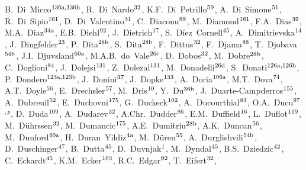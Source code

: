 \begin{flushleft}
B.~Di~Micco$^\textrm{\scriptsize 136a,136b}$,
R.~Di~Nardo$^\textrm{\scriptsize 32}$,
K.F.~Di~Petrillo$^\textrm{\scriptsize 59}$,
A.~Di~Simone$^\textrm{\scriptsize 51}$,
R.~Di~Sipio$^\textrm{\scriptsize 161}$,
D.~Di~Valentino$^\textrm{\scriptsize 31}$,
C.~Diaconu$^\textrm{\scriptsize 88}$,
M.~Diamond$^\textrm{\scriptsize 161}$,
F.A.~Dias$^\textrm{\scriptsize 39}$,
M.A.~Diaz$^\textrm{\scriptsize 34a}$,
E.B.~Diehl$^\textrm{\scriptsize 92}$,
J.~Dietrich$^\textrm{\scriptsize 17}$,
S.~D\'iez~Cornell$^\textrm{\scriptsize 45}$,
A.~Dimitrievska$^\textrm{\scriptsize 14}$,
J.~Dingfelder$^\textrm{\scriptsize 23}$,
P.~Dita$^\textrm{\scriptsize 28b}$,
S.~Dita$^\textrm{\scriptsize 28b}$,
F.~Dittus$^\textrm{\scriptsize 32}$,
F.~Djama$^\textrm{\scriptsize 88}$,
T.~Djobava$^\textrm{\scriptsize 54b}$,
J.I.~Djuvsland$^\textrm{\scriptsize 60a}$,
M.A.B.~do~Vale$^\textrm{\scriptsize 26c}$,
D.~Dobos$^\textrm{\scriptsize 32}$,
M.~Dobre$^\textrm{\scriptsize 28b}$,
C.~Doglioni$^\textrm{\scriptsize 84}$,
J.~Dolejsi$^\textrm{\scriptsize 131}$,
Z.~Dolezal$^\textrm{\scriptsize 131}$,
M.~Donadelli$^\textrm{\scriptsize 26d}$,
S.~Donati$^\textrm{\scriptsize 126a,126b}$,
P.~Dondero$^\textrm{\scriptsize 123a,123b}$,
J.~Donini$^\textrm{\scriptsize 37}$,
J.~Dopke$^\textrm{\scriptsize 133}$,
A.~Doria$^\textrm{\scriptsize 106a}$,
M.T.~Dova$^\textrm{\scriptsize 74}$,
A.T.~Doyle$^\textrm{\scriptsize 56}$,
E.~Drechsler$^\textrm{\scriptsize 57}$,
M.~Dris$^\textrm{\scriptsize 10}$,
Y.~Du$^\textrm{\scriptsize 36b}$,
J.~Duarte-Campderros$^\textrm{\scriptsize 155}$,
A.~Dubreuil$^\textrm{\scriptsize 52}$,
E.~Duchovni$^\textrm{\scriptsize 175}$,
G.~Duckeck$^\textrm{\scriptsize 102}$,
A.~Ducourthial$^\textrm{\scriptsize 83}$,
O.A.~Ducu$^\textrm{\scriptsize 97}$$^{,p}$,
D.~Duda$^\textrm{\scriptsize 109}$,
A.~Dudarev$^\textrm{\scriptsize 32}$,
A.Chr.~Dudder$^\textrm{\scriptsize 86}$,
E.M.~Duffield$^\textrm{\scriptsize 16}$,
L.~Duflot$^\textrm{\scriptsize 119}$,
M.~D\"uhrssen$^\textrm{\scriptsize 32}$,
M.~Dumancic$^\textrm{\scriptsize 175}$,
A.E.~Dumitriu$^\textrm{\scriptsize 28b}$,
A.K.~Duncan$^\textrm{\scriptsize 56}$,
M.~Dunford$^\textrm{\scriptsize 60a}$,
H.~Duran~Yildiz$^\textrm{\scriptsize 4a}$,
M.~D\"uren$^\textrm{\scriptsize 55}$,
A.~Durglishvili$^\textrm{\scriptsize 54b}$,
D.~Duschinger$^\textrm{\scriptsize 47}$,
B.~Dutta$^\textrm{\scriptsize 45}$,
D.~Duvnjak$^\textrm{\scriptsize 1}$,
M.~Dyndal$^\textrm{\scriptsize 45}$,
B.S.~Dziedzic$^\textrm{\scriptsize 42}$,
C.~Eckardt$^\textrm{\scriptsize 45}$,
K.M.~Ecker$^\textrm{\scriptsize 103}$,
R.C.~Edgar$^\textrm{\scriptsize 92}$,
T.~Eifert$^\textrm{\scriptsize 32}$,
$$
\end{flushleft}
